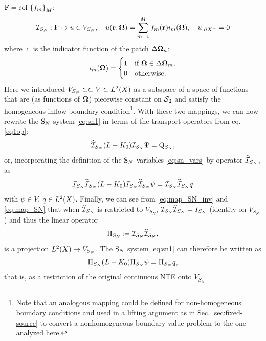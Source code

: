 \mbox{$\mathrm{F} = \colset{f_m}{\idxset{M}}$}:
\begin{equation}\label{eq:map_SN}
\PiSN: \mathrm{F} \mapsto u\in V_{S_N},\quad
u(\br,\bomega) = \sum_{m=1}^M f_m(\br)\imath_m(\bomega),\quad
u\vert_{\pX[-]} = 0
\end{equation}
where $\imath$ is the indicator function of the patch $\Delta\bomega_n$:
\begin{equation}\label{eq:indicator}
\imath_m(\bomega) = \pw{1}{if $\bomega \in \Delta\bomega_m$}{0}{otherwise.}
\end{equation}
Here we introduced $V_{S_N}\subset \subset V \subset \Lp[2](X)$ as a subspace of a space of functions that
are (as functions of $\bomega$) piecewise constant on $\Sphere$ and satisfy the homogeneous inflow boundary condition\footnote{Note that an
analogous mapping could be defined for non-homogeneous boundary conditions and used in a lifting argument
as in Sec. \ref{sec:fixed-source} to convert a nonhomogeneous boundary value problem to the one analyzed here.}. With
these two mappings, we can now rewrite the $\SN$ system \eqref{eq:sn1} in terms of the transport operators from eq.
\eqref{eq1op}:
\begin{equation}\label{eq:sn_op}
	\PihSN (\op{L} - \op{K}_0) \PiSN \Psi = \mathrm{Q}_{S_N},
\end{equation}
or, incorporating the definition of the $\SN$ variables \eqref{eq:sn_vars} by operator $\PihSN$, as
\begin{equation}\label{eq:sn_op2}
	\PiSN \PihSN (\op{L} - \op{K}_0)\PiSN \PihSN \psi = \PiSN \PihSN q
\end{equation} 
with $\psi \in V$, $q \in \Lp[2](X)$. Finally, we can see from \eqref{eq:map_SN_inv} and \eqref{eq:map_SN} that when
$\PihSN$ is restricted to $V_{S_N}$, $\PiSN\PihSN = I_{S_N}$ (identity on $V_{S_N}$) and thus the linear operator
\begin{equation}\label{eq:proj_sn}
	\Projop[S_N] \coloneqq \PiSN\PihSN,
\end{equation}
is a projection $\Lp[2](X)\to V_{S_N}$. The $\SN$ system \eqref{eq:sn1} can
therefore be written as
\begin{equation}\label{eq:sn_op3}
	\Projop[S_N] (\op{L} - \op{K}_0)\Projop[S_N] \psi = \Projop[S_N] q,
\end{equation}
that is, as a restriction of the original continuous NTE onto $V_{S_N}$. 

